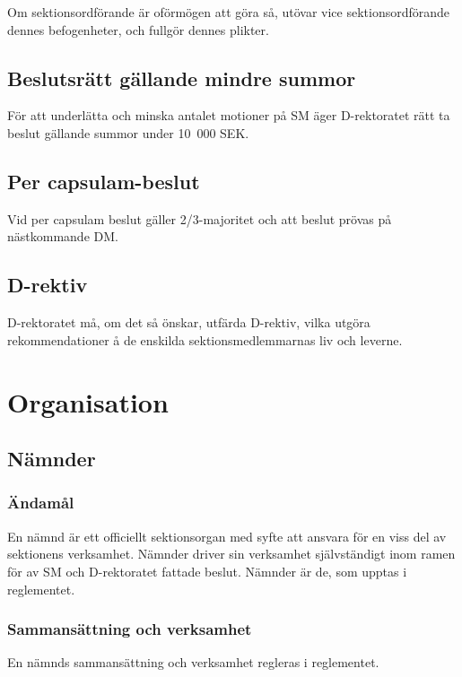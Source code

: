 \documentclass{dgovdoc}
\begin{document}
Om sektionsordförande är oförmögen att göra så, utövar vice sektionsordförande
dennes befogenheter, och fullgör dennes plikter.

\subsection{Beslutsrätt gällande mindre summor}

För att underlätta och minska antalet motioner på SM äger D-rektoratet rätt ta
beslut gällande summor under 10~000 SEK.

\subsection{Per capsulam-beslut}

Vid per capsulam beslut gäller 2/3-majoritet och att beslut prövas på
nästkommande DM.

\subsection{D-rektiv}

D-rektoratet må, om det så önskar, utfärda D-rektiv, vilka utgöra
rekommendationer å de enskilda sektionsmedlemmarnas liv och leverne.

\section{Organisation}

\subsection{Nämnder}
\label{sec:namnder}

\subsubsection{Ändamål}

En nämnd är ett officiellt sektionsorgan med syfte att ansvara för en viss del
av sektionens verksamhet. Nämnder driver sin verksamhet självständigt inom
ramen för av SM och D-rektoratet fattade beslut. Nämnder är de, som upptas i
reglementet.

\subsubsection{Sammansättning och verksamhet}

En nämnds sammansättning och verksamhet regleras i reglementet.
\end{document}
